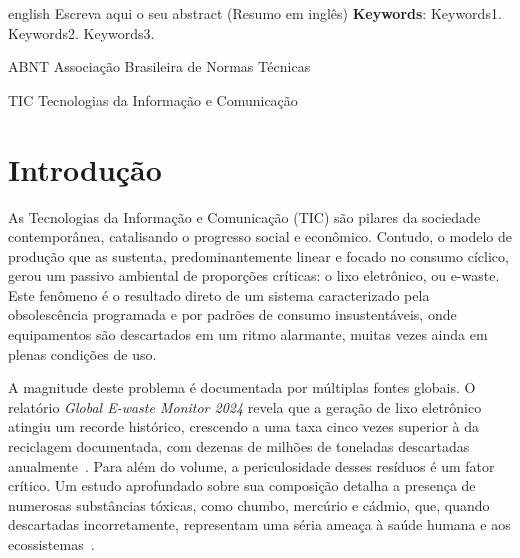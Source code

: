 \documentclass[
	12pt,				%
	openright,			%
	oneside,			%
	a4paper,			%
	english,			%
	brazil				%
	]{abntex2}
\theoremstyle{definition}
\begin{document}
\begin{resumo}[Abstract]
 \begin{otherlanguage*}{english}
   Escreva aqui o seu abstract (Resumo em inglês)
   \vspace{\onelineskip}
   \noindent 
   \textbf{Keywords}: Keywords1. Keywords2. Keywords3.
 \end{otherlanguage*}
\end{resumo}

\listoffigures*
\cleardoublepage{}

\listofquadros*
\cleardoublepage{}

\listoftables*
\cleardoublepage{}

\imprimirlistadealgoritmos{}
\cleardoublepage{}

\begin{siglas}
  \item[ABNT] Associação Brasileira de Normas Técnicas
  \item[TIC] Tecnologias da Informação e Comunicação
\end{siglas}

\tableofcontents*
\cleardoublepage{}

\textual{}
\pagestyle{simple}

\chapter[Introdução]{Introdução}

As Tecnologias da Informação e Comunicação (TIC) são pilares da sociedade contemporânea, catalisando o progresso social e econômico. Contudo, o modelo de produção que as sustenta, predominantemente linear e focado no consumo cíclico, gerou um passivo ambiental de proporções críticas: o lixo eletrônico, ou e-waste. Este fenômeno é o resultado direto de um sistema caracterizado pela obsolescência programada e por padrões de consumo insustentáveis, onde equipamentos são descartados em um ritmo alarmante, muitas vezes ainda em plenas condições de uso.

A magnitude deste problema é documentada por múltiplas fontes globais. O relatório \textit{Global E-waste Monitor 2024} revela que a geração de lixo eletrônico atingiu um recorde histórico, crescendo a uma taxa cinco vezes superior à da reciclagem documentada, com dezenas de milhões de toneladas descartadas anualmente~\cite{forti2024}. Para além do volume, a periculosidade desses resíduos é um fator crítico. Um estudo aprofundado sobre sua composição detalha a presença de numerosas substâncias tóxicas, como chumbo, mercúrio e cádmio, que, quando descartadas incorretamente, representam uma séria ameaça à saúde humana e aos ecossistemas~\cite{perkins2014}.
\end{document}
